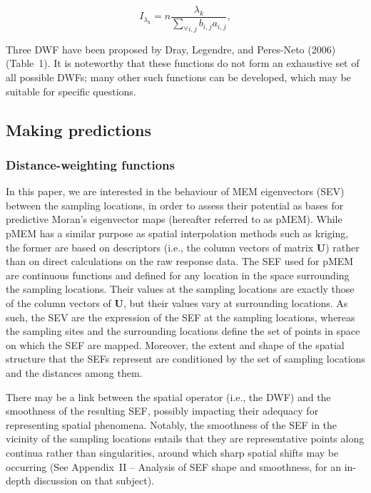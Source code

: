 \documentclass[
]{article}
\begin{document}
\[
I_{\lambda_k} = n \frac{\lambda_k}{\sum_{\forall i,j}b_{i,j}a_{i,j}},
\label{eq2}\tag{2}
\]

Three DWF have been proposed by Dray, Legendre, and Peres-Neto (2006)
(Table~1). It is noteworthy that these functions do not form an
exhaustive set of all possible DWFs; many other such functions can be
developed, which may be suitable for specific questions.

\subsection{Making predictions}\label{making-predictions}

\subsubsection{Distance-weighting
functions}\label{distance-weighting-functions}

In this paper, we are interested in the behaviour of MEM eigenvectors
(SEV) between the sampling locations, in order to assess their potential
as bases for predictive Moran's eigenvector maps (hereafter referred to
as pMEM). While pMEM has a similar purpose as spatial interpolation
methods such as kriging, the former are based on descriptors (i.e., the
column vectors of matrix \(\mathbf{U}\)) rather than on direct
calculations on the raw response data. The SEF used for pMEM are
continuous functions and defined for any location in the space
surrounding the sampling locations. Their values at the sampling
locations are exactly those of the column vectors of \(\mathbf{U}\), but
their values vary at surrounding locations. As such, the SEV are the
expression of the SEF at the sampling locations, whereas the sampling
sites and the surrounding locations define the set of points in space on
which the SEF are mapped. Moreover, the extent and shape of the spatial
structure that the SEFs represent are conditioned by the set of sampling
locations and the distances among them.

There may be a link between the spatial operator (i.e., the DWF) and the
smoothness of the resulting SEF, possibly impacting their adequacy for
representing spatial phenomena. Notably, the smoothness of the SEF in
the vicinity of the sampling locations entails that they are
representative points along continua rather than singularities, around
which sharp spatial shifts may be occurring (See Appendix~II -- Analysis
of SEF shape and smoothness, for an in-depth discussion on that
subject).
\end{document}
